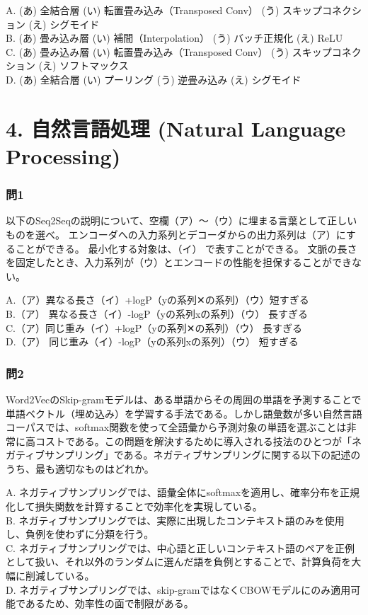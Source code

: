 \documentclass[
  letterpaper,
  DIV=11,
  numbers=noendperiod]{scrreprt}
\begin{document}
A. (あ) 全結合層 (い) 転置畳み込み（Transposed Conv） (う)
スキップコネクション (え) シグモイド\\
B. (あ) 畳み込み層 (い) 補間（Interpolation） (う) バッチ正規化 (え)
ReLU\\
C. (あ) 畳み込み層 (い) 転置畳み込み（Transposed Conv） (う)
スキップコネクション (え) ソフトマックス\\
D. (あ) 全結合層 (い) プーリング (う) 逆畳み込み (え) シグモイド

\chapter{4. 自然言語処理 (Natural Language
Processing)}\label{ux81eaux7136ux8a00ux8a9eux51e6ux7406-natural-language-processing}

\subsection{問1}\label{ux554f1-5}

以下のSeq2Seqの説明について、空欄（ア）～（ウ）に埋まる言葉として正しいものを選べ。
エンコーダへの入力系列とデコーダからの出力系列は（ア）にすることができる。
最小化する対象は、（イ） で表すことができる。
文脈の長さを固定したとき、入力系列が（ウ）とエンコードの性能を担保することができない。

A.（ア）異なる長さ（イ）+logP（yの系列\textbar✕の系列）（ウ）短すぎる\\
B.（ア） 異なる長さ（イ）-logP（yの系列\textbar xの系列）（ウ）
長すぎる\\
C.（ア）同じ重み（イ）+logP（yの系列\textbar✕の系列）（ウ） 長すぎる\\
D.（ア） 同じ重み（イ）-logP（yの系列xの系列）（ウ） 短すぎる

\subsection{問2}\label{ux554f2-2}

Word2VecのSkip-gramモデルは、ある単語からその周囲の単語を予測することで単語ベクトル（埋め込み）を学習する手法である。しかし語彙数が多い自然言語コーパスでは、softmax関数を使って全語彙から予測対象の単語を選ぶことは非常に高コストである。この問題を解決するために導入される技法のひとつが「ネガティブサンプリング」である。ネガティブサンプリングに関する以下の記述のうち、最も適切なものはどれか。

A.
ネガティブサンプリングでは、語彙全体にsoftmaxを適用し、確率分布を正規化して損失関数を計算することで効率化を実現している。\\
B.
ネガティブサンプリングでは、実際に出現したコンテキスト語のみを使用し、負例を使わずに分類を行う。\\
C.
ネガティブサンプリングでは、中心語と正しいコンテキスト語のペアを正例として扱い、それ以外のランダムに選んだ語を負例とすることで、計算負荷を大幅に削減している。\\
D.
ネガティブサンプリングでは、skip-gramではなくCBOWモデルにのみ適用可能であるため、効率性の面で制限がある。
\end{document}
